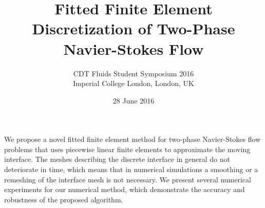 \documentclass{article}
\begin{document}
\title{Fitted Finite Element Discretization of Two-Phase Navier-Stokes Flow}
\date{28 June 2016}
\author{CDT Fluids Student Symposium 2016\\
Imperial College London, London, UK}

\maketitle
We propose a novel fitted finite element method for two-phase Navier-Stokes flow
problems that uses piecewise linear finite elements to approximate the moving
interface. The meshes describing the discrete interface in general do not
deteriorate in time, which means that in numerical simulations a smoothing or a
remeshing of the interface mesh is not necessary. We present several numerical
experiments for our numerical method, which demonstrate the accuracy and
robustness of the proposed algorithm.
\end{document}
